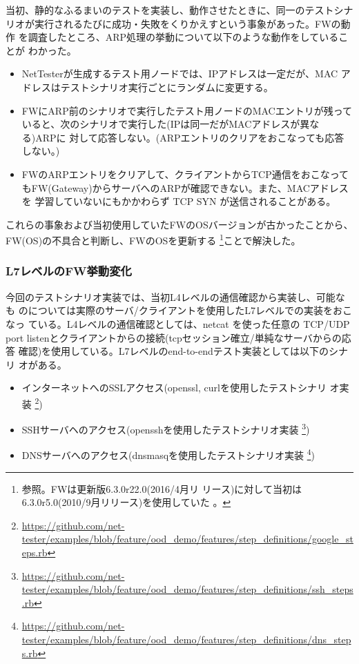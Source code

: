 当初、静的なふるまいのテストを実装し、動作させたときに、同一のテストシナ
リオが実行されるたびに成功・失敗をくりかえすという事象があった。FWの動作
を調査したところ、ARP処理の挙動について以下のような動作をしていることが
わかった。
\begin{itemize}
 \item NetTesterが生成するテスト用ノードでは、IPアドレスは一定だが、MAC
       アドレスはテストシナリオ実行ごとにランダムに変更する。
 \item FWにARP前のシナリオで実行したテスト用ノードのMACエントリが残って
       いると、次のシナリオで実行した(IPは同一だがMACアドレスが異なる)ARPに
       対して応答しない。(ARPエントリのクリアをおこなっても応答しない。)
 \item FWのARPエントリをクリアして、クライアントからTCP通信をおこなって
       もFW(Gateway)からサーバへのARPが確認できない。また、MACアドレスを
       学習していないにもかかわらず TCP SYN が送信されることがある。
\end{itemize}

これらの事象および当初使用していたFWのOSバージョンが古かったことから、
FW(OS)の不具合と判断し、FWのOSを更新する
\footnote{参照。FWは更新版6.3.0r22.0(2016/4月リ
リース)に対して当初は6.3.0r5.0(2010/9月リリース)を使用していた
\cite{screenos-releases}。}ことで解決した。

   \subsubsection{L7レベルのFW挙動変化}
今回のテストシナリオ実装では、当初L4レベルの通信確認から実装し、可能なも
のについては実際のサーバ/クライアントを使用したL7レベルでの実装をおこなっ
ている。L4レベルの通信確認としては、netcat を使った任意の TCP/UDP port
listenとクライアントからの接続(tcpセッション確立/単純なサーバからの応答
確認)を使用している。L7レベルのend-to-endテスト実装としては以下のシナリ
オがある。
\begin{itemize}
 \item インターネットへのSSLアクセス(openssl, curlを使用したテストシナリ
       オ実装
       \footnote{\url{https://github.com/net-tester/examples/blob/feature/ood_demo/features/step_definitions/google_steps.rb}})
 \item SSHサーバヘのアクセス(opensshを使用したテストシナリオ実装
       \footnote{\url{https://github.com/net-tester/examples/blob/feature/ood_demo/features/step_definitions/ssh_steps.rb}})
 \item DNSサーバへのアクセス(dnsmasqを使用したテストシナリオ実装
       \footnote{\url{https://github.com/net-tester/examples/blob/feature/ood_demo/features/step_definitions/dns_steps.rb}})
\end{itemize}

